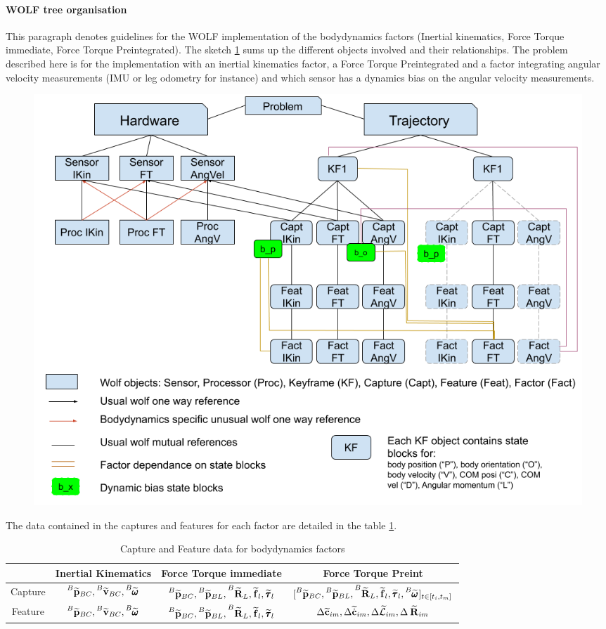 \documentclass[11pt]{article}
\newcommand{\Rotm}[2]{\prescript{#1}{}{\widetilde{\bfR}}_{#2}}
\newcommand{\posim}[2]{\prescript{#1}{}{\widetilde{\bfp}}_{#2}}
\newcommand{\velm}[2]{\prescript{#1}{}{\widetilde{\bfv}}_{#2}}
\newcommand{\angvelm}[2]{\prescript{#1}{}{\widetilde{\pmb{\omega}}}_{#2}}
\newcommand{\forcem}[2]{\prescript{#1}{}{\widetilde{\bff}}_{#2}}
\newcommand{\torquem}[2]{\prescript{#1}{}{\widetilde{\pmb{\tau}}}_{#2}}
\newcommand{\AMm}{\widetilde{\mathcal{L}}}
\newcommand{\COMm}{\widetilde{\bfc}}
\newcommand{\COMdm}{\widetilde{\dot{\bfc}}}
\begin{document}
\paragraph{WOLF tree organisation}

This paragraph denotes guidelines for the WOLF implementation of the bodydynamics factors (Inertial kinematics, Force Torque immediate, Force Torque Preintegrated). The sketch \ref{fig:WOLFTreeBodydynamics} sums up the different objects involved and their relationships. The problem described here is for the implementation with an inertial kinematics factor, a Force Torque Preintegrated and a factor integrating angular velocity measurements (IMU or leg odometry for instance) and which sensor has a dynamics bias on the angular velocity measurements.

\begin{figure}[ht!]
	\centering
	\includegraphics[width=1\linewidth]{img/WOLFTreeBodydynamics.png}
	\label{fig:WOLFTreeBodydynamics}
\end{figure}


The data contained in the captures and features for each factor are detailed in the table \ref{tab:WolfCaptFeatData}.

\begin{table}[ht!]
\begin{tabular}{|c|c|c|c|}
\hline	 	
& Inertial Kinematics & Force Torque immediate & Force Torque Preint
\\
\hline	 
Capture & $\posim{B}{BC}, \velm{B}{BC}, \angvelm{B}{} $ & $\posim{B}{BC}, \posim{B}{BL}, \Rotm{B}{L}, \forcem{}{l}, \torquem{}{l} $ & $[\posim{B}{BC}, \posim{B}{BL}, \Rotm{B}{L}, \forcem{}{l}, \torquem{}{l}, \angvelm{B}{}]_{t \in [t_i,t_m]} $
\\
\hline	 
Feature & $\posim{B}{BC}, \velm{B}{BC}, \angvelm{B}{} $ & $\posim{B}{BC}, \posim{B}{BL}, \Rotm{B}{L}, \forcem{}{l}, \torquem{}{l} $ & $\Delta \COMm_{im}, \Delta \COMdm_{im}, \Delta \AMm_{im}, \Delta \Rotm{}{im} $
\\
\hline	 
\end{tabular}
\caption{Capture and Feature data for bodydynamics factors}
\label{tab:WolfCaptFeatData}
\end{table}
\end{document}
